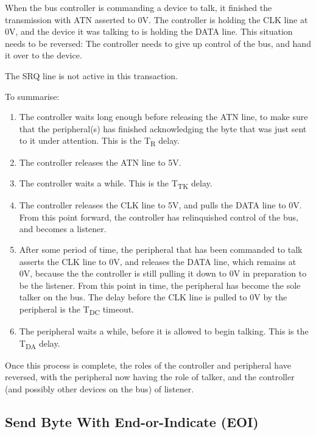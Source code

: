 When the bus controller is commanding a device to talk, it finished
the transmission with ATN asserted to 0V.  The controller is holding
the CLK line at 0V, and the device it was talking to is holding the
DATA line.  This situation needs to be reversed: The controller needs
to give up control of the bus, and hand it over to the device.

The SRQ line is not active in this transaction.

To summarise:

\begin{enumerate}
\item The controller waits long enough before releasing the
ATN line, to make sure that the peripheral(s) has finished acknowledging the
byte that was just sent to it under attention. This is the T\textsubscript{R} delay.
\item The controller releases the ATN line to 5V.
\item The controller waits a while. This is the T\textsubscript{TK} delay.
\item The controller releases the CLK line to 5V, and pulls the DATA
  line to 0V. From this point
  forward, the controller has relinquished control of the bus, and
  becomes a listener.
\item After some period of time, the peripheral that has been
  commanded to talk asserts the CLK line to 0V, and releases the DATA
  line, which remains at 0V, because the the controller is still
  pulling it down to 0V in preparation to be the listener.
  From this point
  in time, the peripheral has become the sole talker on the
  bus. The delay before the CLK line is pulled to 0V by the
  peripheral is the T\textsubscript{DC} timeout.
\item The peripheral waits a while, before it is allowed to
  begin talking. This is the T\textsubscript{DA} delay.
\end{enumerate}

Once this process is complete, the roles of the controller and
peripheral have reversed, with the peripheral now having the role of
talker, and the controller (and possibly other devices on the bus) of
listener.

\subsection{Send Byte With End-or-Indicate (EOI)}

